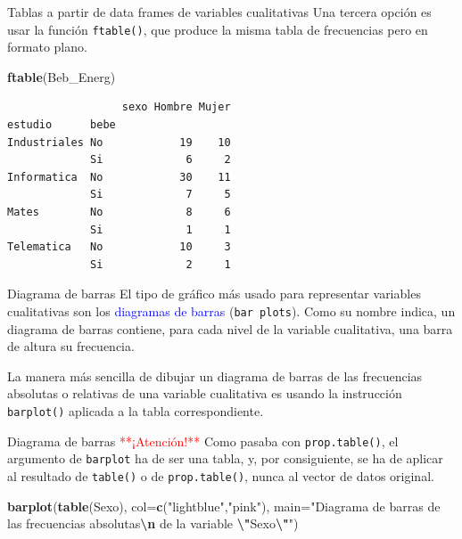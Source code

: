 \documentclass[
  ignorenonframetext,
  aspectratio=169]{beamer}
\newenvironment{Shaded}{\begin{snugshade}}{\end{snugshade}}
\newcommand{\AttributeTok}[1]{\textcolor[rgb]{0.13,0.29,0.53}{#1}}
\newcommand{\FunctionTok}[1]{\textcolor[rgb]{0.13,0.29,0.53}{\textbf{#1}}}
\newcommand{\NormalTok}[1]{#1}
\newcommand{\SpecialCharTok}[1]{\textcolor[rgb]{0.81,0.36,0.00}{\textbf{#1}}}
\newcommand{\StringTok}[1]{\textcolor[rgb]{0.31,0.60,0.02}{#1}}
\newcommand\blue[1]{\textcolor{blue}{#1}}
\newcommand\red[1]{\textcolor{red}{#1}}
\begin{document}
\begin{frame}[fragile]{Tablas a partir de data frames de variables
cualitativas}
\label{tablas-a-partir-de-data-frames-de-variables-cualitativas-9}
Una tercera opción es usar la función \texttt{ftable()}, que produce la
misma tabla de frecuencias pero en formato plano.

\begin{Shaded}
\begin{Highlighting}[]
\FunctionTok{ftable}\NormalTok{(Beb\_Energ)}
\end{Highlighting}
\end{Shaded}

\begin{verbatim}
                  sexo Hombre Mujer
estudio      bebe                  
Industriales No            19    10
             Si             6     2
Informatica  No            30    11
             Si             7     5
Mates        No             8     6
             Si             1     1
Telematica   No            10     3
             Si             2     1
\end{verbatim}
\end{frame}

\begin{frame}[fragile]{Diagrama de barras}
\label{diagrama-de-barras}
El tipo de gráfico más usado para representar variables cualitativas son
los \blue{diagramas de barras} (\texttt{bar\ plots}). Como su nombre
indica, un diagrama de barras contiene, para cada nivel de la variable
cualitativa, una barra de altura su frecuencia.

La manera más sencilla de dibujar un diagrama de barras de las
frecuencias absolutas o relativas de una variable cualitativa es usando
la instrucción \texttt{barplot()} aplicada a la tabla correspondiente.
\end{frame}

\begin{frame}[fragile]{Diagrama de barras}
\label{diagrama-de-barras-1}
\red{**¡Atención!**} Como pasaba con \texttt{prop.table()}, el argumento
de \texttt{barplot} ha de ser una tabla, y, por consiguiente, se ha de
aplicar al resultado de \texttt{table()} o de \texttt{prop.table()},
nunca al vector de datos original.

\begin{Shaded}
\begin{Highlighting}[]
\FunctionTok{barplot}\NormalTok{(}\FunctionTok{table}\NormalTok{(Sexo), }\AttributeTok{col=}\FunctionTok{c}\NormalTok{(}\StringTok{"lightblue"}\NormalTok{,}\StringTok{"pink"}\NormalTok{), }
\AttributeTok{main=}\StringTok{"Diagrama de barras de }
\StringTok{las frecuencias absolutas}\SpecialCharTok{\textbackslash{}n}\StringTok{ de la variable }\SpecialCharTok{\textbackslash{}"}\StringTok{Sexo}\SpecialCharTok{\textbackslash{}"}\StringTok{"}\NormalTok{)}
\end{Highlighting}
\end{Shaded}
\end{frame}
\end{document}
